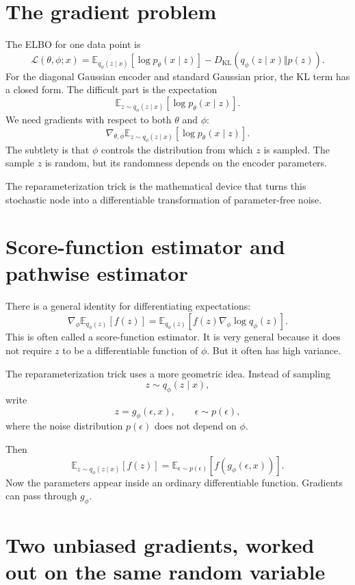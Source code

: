 
\section{The gradient problem}

The ELBO for one data point is
\[
  \mathcal L(\theta,\phi;x)
  =\mathbb E_{q_\phi(z\mid x)}[\log p_\theta(x\mid z)]
  -D_{\mathrm{KL}}(q_\phi(z\mid x)\Vert p(z)).
\]
For the diagonal Gaussian encoder and standard Gaussian prior, the KL term has a closed form.  The difficult part is the expectation
\[
  \mathbb E_{z\sim q_\phi(z\mid x)}[\log p_\theta(x\mid z)].
\]
We need gradients with respect to both \(\theta\) and \(\phi\):
\[
  \nabla_{\theta,\phi}\mathbb E_{z\sim q_\phi(z\mid x)}[\log p_\theta(x\mid z)].
\]
The subtlety is that \(\phi\) controls the distribution from which \(z\) is sampled.  The sample \(z\) is random, but its randomness depends on the encoder parameters.

The reparameterization trick is the mathematical device that turns this stochastic node into a differentiable transformation of parameter-free noise.

\section{Score-function estimator and pathwise estimator}

There is a general identity for differentiating expectations:
\[
  \nabla_\phi\mathbb E_{q_\phi(z)}[f(z)]
  =\mathbb E_{q_\phi(z)}[f(z)\nabla_\phi\log q_\phi(z)].
\]
This is often called a score-function estimator.  It is very general because it does not require \(z\) to be a differentiable function of \(\phi\).  But it often has high variance.

The reparameterization trick uses a more geometric idea.  Instead of sampling
\[
  z\sim q_\phi(z\mid x),
\]
write
\[
  z=g_\phi(\epsilon,x),
  \qquad
  \epsilon\sim p(\epsilon),
\]
where the noise distribution \(p(\epsilon)\) does not depend on \(\phi\).

Then
\[
  \mathbb E_{z\sim q_\phi(z\mid x)}[f(z)]
  =\mathbb E_{\epsilon\sim p(\epsilon)}[f(g_\phi(\epsilon,x))].
\]
Now the parameters appear inside an ordinary differentiable function.  Gradients can pass through \(g_\phi\).

\section{Two unbiased gradients, worked out on the same random variable}

